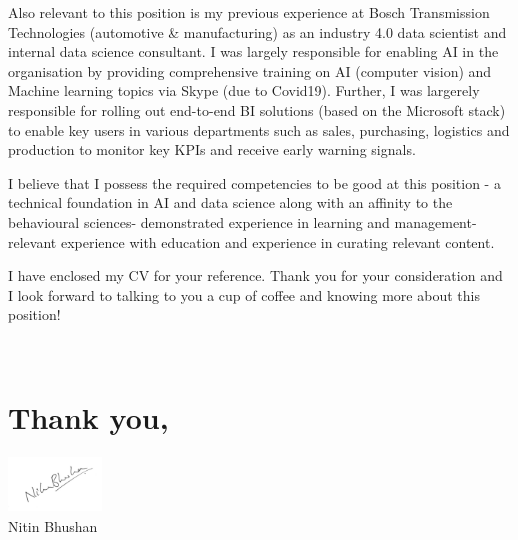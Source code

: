 \begin{flushleft}
{Also relevant to this position is my previous experience at Bosch Transmission Technologies (automotive \& manufacturing) as an industry 4.0 data scientist and internal data science consultant. I was largely responsible for enabling AI in the organisation by providing comprehensive training on AI (computer vision) and Machine learning topics via Skype (due to Covid19). Further, I was largerely responsible for rolling out end-to-end BI solutions (based on the Microsoft stack) to enable key users in various departments such as sales, purchasing, logistics and production to monitor key KPIs and receive early warning signals.


I believe that I possess the required competencies to be good at this position - a technical foundation in AI and data science along with an affinity to the behavioural sciences- demonstrated experience in learning and management- relevant experience with education and experience in curating relevant content. 

 

I have enclosed my CV for your reference. Thank you for your consideration and I look forward to talking to you a cup of coffee and knowing more about this position!}\\

\section{Thank you,}
\includegraphics[width=2.5cm,height=1.5cm]{nbhushan_Signature_v2.jpg}\\
Nitin Bhushan \\
\end{flushleft}


